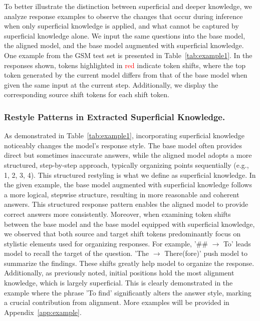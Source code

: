 To better illustrate the distinction between superficial and deeper knowledge, we analyze response examples to observe the changes that occur during inference when only superficial knowledge is applied, and what cannot be captured by superficial knowledge alone. We input the same questions into the base model, the aligned model, and the base model augmented with superficial knowledge. One example from the GSM test set is presented in Table~\ref{tab:example1}. In the responses shown, tokens highlighted in \textcolor{red}{red} indicate  token shifts, where the top token generated by the current model differs from that of the base model when given the same input at the current step. Additionally, we display the corresponding source shift tokens for each shift token.

\subsubsection{Restyle Patterns in Extracted Superficial Knowledge.} As demonstrated in Table~\ref{tab:example1}, incorporating superficial knowledge noticeably changes the model's response style. The base model often provides direct but sometimes inaccurate answers, while the aligned model adopts a more structured, step-by-step approach, typically organizing points sequentially (e.g., 1, 2, 3, 4). This structured restyling is what we define as superficial knowledge.  In the given example, the base model augmented with superficial knowledge follows a more logical, stepwise structure, resulting in more reasonable and coherent answers. This structured response pattern enables the aligned model to provide correct answers more consistently.
Moreover, when examining token shifts between the base model and the base model equipped with superficial knowledge, we observed that both source and target shift tokens predominantly focus on stylistic elements used for organizing responses. For example, '\#\# $\rightarrow$ To'  leads model to recall the target of the question.  'The $\rightarrow$ There(fore)' push model to summarize the findings.  
These shifts greatly help model to organize the response. Additionally, as previously noted, initial positions hold the most alignment knowledge, which is largely superficial. This is clearly demonstrated in the example where the phrase 'To find' significantly alters the answer style, marking a crucial contribution from alignment. More examples will be provided in Appendix~\ref{app:example}.


